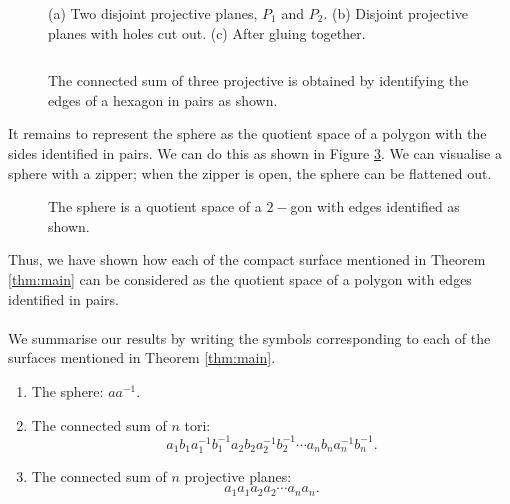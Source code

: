\documentclass{article}
\theoremstyle{definition}
\begin{document}
\begin{figure}[!htb]
  \centering
  \begin{subfigure}{\linewidth}
    \begin{center}
      
    \end{center}
    \caption{}
  \end{subfigure}
  \begin{subfigure}{\linewidth}
    \begin{center}
      
    \end{center}
    \caption{}
  \end{subfigure}
  \begin{subfigure}{\linewidth}
    \begin{center}
      
    \end{center}
    \caption{}
  \end{subfigure}
  \caption{(a) Two disjoint projective planes, $P_1$ and $P_2.$ (b) Disjoint projective planes with holes cut out. (c) After gluing together.}
  \label{fig:pplane 2 sum}
\end{figure}

\newpage
$ $\\
\begin{figure}[H]
  \centering
  
  \caption{The connected sum of three projective is obtained by identifying the edges of a hexagon in pairs as shown.}
  \label{fig:pplane 3 sum}
\end{figure}

It remains to represent the sphere as the quotient space of a polygon with the sides identified in pairs. We can do this as shown in Figure \ref{fig:circle}. We can visualise a sphere with a zipper; when the zipper is open, the sphere can be flattened out.

\begin{figure}[H]
  \centering
  
  \caption{The sphere is a quotient space of a $2-$gon with edges identified as shown.}
  \label{fig:circle}
\end{figure}

Thus, we have shown how each of the compact surface mentioned in Theorem \ref{thm:main} can be considered as the quotient space of a polygon with edges identified in pairs.\\~\\
We summarise our results by writing the symbols corresponding to each of the surfaces mentioned in Theorem \ref{thm:main}.
\begin{enumerate}[nosep] 
  \item The sphere: $aa^{-1}.$
  \item The connected sum of $n$ tori:
  \[a_1b_1a_1^{-1}b_1^{-1}a_2b_2a_2^{-1}b_2^{-1} \cdots a_nb_na_n^{-1}b_n^{-1}.\]
  \item The connected sum of $n$ projective planes:
  \[a_1a_1a_2a_2\cdots a_na_n.\]
\end{enumerate}
%
\end{document}
